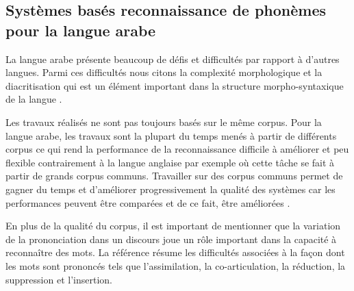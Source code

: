 \subsection{Systèmes basés reconnaissance de phonèmes pour la langue arabe}\label{stateartphoneme}
La langue arabe présente beaucoup de défis et difficultés par rapport à d'autres langues. Parmi ces difficultés nous citons la complexité morphologique et la diacritisation qui est un élément important dans la structure morpho-syntaxique de la langue \cite{diacritisation}. 

Les travaux réalisés ne sont pas toujours basés sur le même corpus. Pour la langue arabe, les travaux sont la plupart du temps menés à partir de différents corpus ce qui rend la performance de la reconnaissance difficile à améliorer et peu flexible contrairement à la langue anglaise par exemple où cette tâche se fait à partir de grands corpus communs. Travailler sur des corpus communs permet de gagner du temps et d'améliorer progressivement la qualité des systèmes car les performances peuvent être comparées et de ce fait, être améliorées \cite{arasurvey}.

En plus de la qualité du corpus, il est important de mentionner que la variation de la prononciation dans un discours joue un rôle important dans la capacité à reconnaître des mots. La référence \cite{prononciation} résume les difficultés associées à la façon dont les mots sont prononcés tels que l'assimilation, la co-articulation, la réduction, la suppression et l'insertion.

